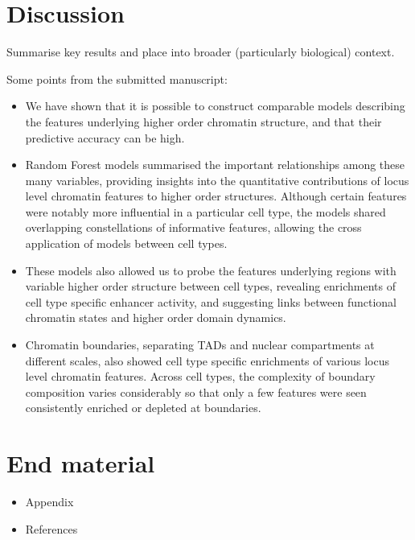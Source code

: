 \documentclass[a4paper,10pt,oneside]{book}
\begin{document}
\chapter{Discussion}

Summarise key results and place into broader (particularly biological)
context.

Some points from the submitted manuscript:

\begin{itemize}
\itemsep1pt\parskip0pt
\item
  We have shown that it is possible to construct comparable models
  describing the features underlying higher order chromatin structure,
  and that their predictive accuracy can be high.
\item
  Random Forest models summarised the important relationships among
  these many variables, providing insights into the quantitative
  contributions of locus level chromatin features to higher order
  structures. Although certain features were notably more influential in
  a particular cell type, the models shared overlapping constellations
  of informative features, allowing the cross application of models
  between cell types.
\item
  These models also allowed us to probe the features underlying regions
  with variable higher order structure between cell types, revealing
  enrichments of cell type specific enhancer activity, and suggesting
  links between functional chromatin states and higher order domain
  dynamics.
\item
  Chromatin boundaries, separating TADs and nuclear compartments at
  different scales, also showed cell type specific enrichments of
  various locus level chromatin features. Across cell types, the
  complexity of boundary composition varies considerably so that only a
  few features were seen consistently enriched or depleted at
  boundaries.
\end{itemize}

\chapter{End material}

\begin{itemize}
\itemsep1pt\parskip0pt
\item
  Appendix
\item
  References
\end{itemize}



\end{document}
